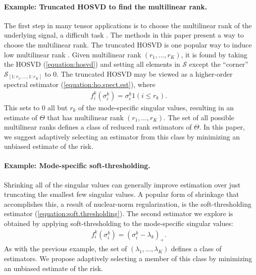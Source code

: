 \paragraph{Example: Truncated HOSVD to find the multilinear rank.}
The first step in many tensor applications is to choose the multilinear rank of the underlying signal, a difficult task \citep{timmerman2000three,kiers2003fast,ceulemans2006selecting}. The methods in this paper present a way to choose the multilinear rank. The truncated HOSVD is one popular way to induce low multilinear rank \citep{de2000multilinear}. Given multilinear rank $(r_1,\ldots,r_K)$, it is found by taking the HOSVD (\ref{equation:hosvd}) and setting all elements in $\mathcal{S}$ except the ``corner'' $\mathcal{S}_{[1:r_1,\ldots,1:r_K]}$ to $0$. The truncated HOSVD may be viewed as a higher-order spectral estimator (\ref{equation:ho.spect.est}), where
\begin{align}
\label{equation:trunc.shrink}
f^k_i(\sigma_i^k) = \sigma_i^k1(i \leq r_k).
\end{align}
This sets to 0 all but $r_k$ of the mode-specific singular values, resulting in an estimate of $\Theta$ that has multilinear rank $(r_1,\ldots,r_K)$. The set of all possible multilinear ranks defines a class of reduced rank estimators of $\Theta$. In this paper, we suggest adaptively selecting an estimator from this class by minimizing an unbiased estimate of the risk.


\paragraph{Example: Mode-specific soft-thresholding.}
Shrinking all of the singular values can generally improve estimation over just truncating the smallest few singular values. A popular form of shrinkage that accomplishes this, a result of nuclear-norm regularization, is the soft-thresholding estimator (\ref{equation:soft.thresholding}). The second estimator we explore is obtained by applying soft-thresholding to the mode-specific singular values:
\begin{align}
  \label{equation:mode.specific.soft}
  f^k_i(\sigma_i^k) = (\sigma_i^k - \lambda_k)_+.
\end{align}
As with the previous example, the set of $(\lambda_1,\ldots,\lambda_K)$ defines a class of estimators. We propose adaptively selecting a member of this class by minimizing an unbiased estimate of the risk.

